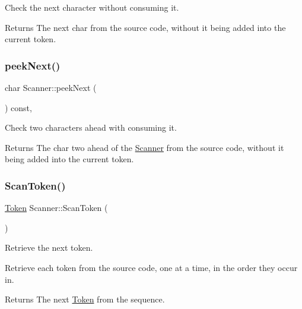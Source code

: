 Check the next character without consuming it. 

\begin{DoxyReturn}{Returns}
The next char from the source code, without it being added into the current token. 
\end{DoxyReturn}
\mbox{\label{class_scanner_a7641b64d926934c5007c3b33191f1422}} 
\subsubsection{\texorpdfstring{peek\+Next()}{peekNext()}}
{\footnotesize\ttfamily char Scanner\+::peek\+Next (\begin{DoxyParamCaption}{ }\end{DoxyParamCaption}) const\hspace{0.3cm}{\ttfamily [inline]}, {\ttfamily [private]}}



Check two characters ahead with consuming it. 

\begin{DoxyReturn}{Returns}
The char two ahead of the \hyperlink{class_scanner}{Scanner} from the source code, without it being added into the current token. 
\end{DoxyReturn}
\mbox{\label{class_scanner_ae576450fd0cbbe93dd00b7a1acfaae8b}} 
\subsubsection{\texorpdfstring{Scan\+Token()}{ScanToken()}}
{\footnotesize\ttfamily \hyperlink{struct_token}{Token} Scanner\+::\+Scan\+Token (\begin{DoxyParamCaption}{ }\end{DoxyParamCaption})}



Retrieve the next token. 

Retrieve each token from the source code, one at a time, in the order they occur in. \begin{DoxyReturn}{Returns}
The next \hyperlink{struct_token}{Token} from the sequence. 
\end{DoxyReturn}
\mbox{\label{class_scanner_ab32009f01ca94ea6b5537a0283514aaa}} 
